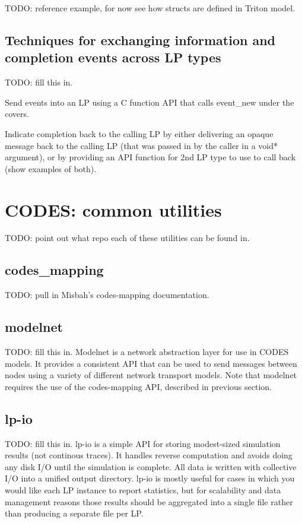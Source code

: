\documentclass[conference,10pt,compsocconf,onecolumn]{IEEEtran}
\begin{document}
TODO: reference example, for now see how structs are defined in Triton
model.

\subsection{Techniques for exchanging information and completion events
across LP types}
\label{sec:completion}

TODO: fill this in.

Send events into an LP using a C function API that calls event\_new under
the covers.

Indicate completion back to the calling LP by either delivering an opaque 
message back to the calling LP (that was passed in by the caller in a void*
argument), or by providing an API function for 2nd LP type to
use to call back (show examples of both).

\section{CODES: common utilities}

TODO: point out what repo each of these utilities can be found in.

\subsection{codes\_mapping}
\label{sec:mapping}

TODO: pull in Misbah's codes-mapping documentation.

\subsection{modelnet}

TODO: fill this in.  Modelnet is a network abstraction layer for use in
CODES models.  It provides a consistent API that can be used to send
messages between nodes using a variety of different network transport
models.  Note that modelnet requires the use of the codes-mapping API,
described in previous section.

\subsection{lp-io}

TODO: fill this in.  lp-io is a simple API for storing modest-sized
simulation results (not continous traces).  It handles reverse computation
and avoids doing any disk I/O until the simulation is complete.  All data is
written with collective I/O into a unified output directory.  lp-io is
mostly useful for cases in which you would like each LP instance to report
statistics, but for scalability and data management reasons those results
should be aggregated into a single file rather than producing a separate
file per LP.
\end{document}
